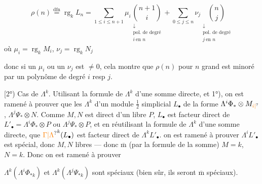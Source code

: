 
\[
\rho(n)\overset{\mathrm{dfn}}{=}\operatorname{rg}_k L_n
=\sum_{1\leq i\leq n+1}\mu_i
\underset{\substack{\downarrow\\\text{pol. de degré}\\i\ \text{en }n}}{\binom{n+1}{i}}
+\sum_{0\leq j\leq n}\nu_j
\underset{\substack{\downarrow\\\text{pol. de degré}\\j\ \text{en }n}}{\binom n j}
\]
où $\mu_i=\operatorname{rg}_k M_i$, $\nu_j=\operatorname{rg}_k N_j$

donc si  un $\mu_i$ ou un $\nu_j$ est $\ne0$, cela montre que $\rho(n)$ pour $n$ grand est minoré par un polynôme de degré $i$ resp $j$.

[2°) Cas de $\Lambda^k$. Utilisant la formule de $\Lambda^k$ d'une somme directe, et 1°), on est ramené à prouver que les $\Lambda^k$ d'un module $\frac12$ simplicial $L_{\bullet}$ de la forme $\Lambda^i\Phi_*\otimes M_{\unsure{i|{}}}$, $\Lambda^j\Psi_*\otimes N$. Comme $M,N$ est  direct d'un libre $P$, $L_{\bullet}$ est facteur direct de $L'_{\bullet}=\Lambda^i\Phi_*\otimes P$ ou $\Lambda^j\Psi_*\otimes P$,   et en réutilisant la formule de $\Lambda^k$ d'une somme directe,  que $\unsure{\Gamma|\Lambda}^k(L_{\bullet})$ est facteur direct de $\Lambda^k L'_{\bullet}$.  on est ramené à prouver $\Lambda^i L'_{\bullet}$ est  spécial, donc  $M,N$ libres --- donc $\overline{\mathrm m}$ (par la formule de la somme) $M=k$, $N=k$. Donc on est ramené à prouver

$\Lambda^k(\Lambda^i\Phi_{*k})$ et $\Lambda^k(\Lambda^j\Psi_{*k})$ sont spéciaux (bien sûr, ils seront $\overline{\mathrm m}$  spéciaux).


